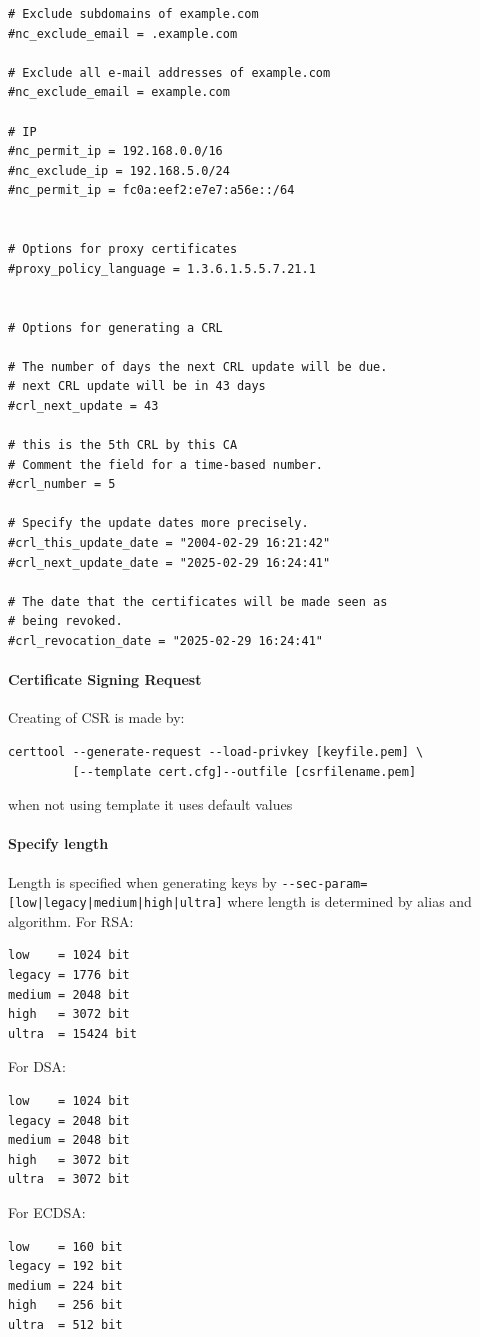 \documentclass[10pt, a4paper]{report}
\begin{document}
\begin{verbatim}
# Exclude subdomains of example.com
#nc_exclude_email = .example.com

# Exclude all e-mail addresses of example.com
#nc_exclude_email = example.com

# IP
#nc_permit_ip = 192.168.0.0/16
#nc_exclude_ip = 192.168.5.0/24
#nc_permit_ip = fc0a:eef2:e7e7:a56e::/64


# Options for proxy certificates
#proxy_policy_language = 1.3.6.1.5.5.7.21.1


# Options for generating a CRL

# The number of days the next CRL update will be due.
# next CRL update will be in 43 days
#crl_next_update = 43

# this is the 5th CRL by this CA
# Comment the field for a time-based number.
#crl_number = 5

# Specify the update dates more precisely.
#crl_this_update_date = "2004-02-29 16:21:42"
#crl_next_update_date = "2025-02-29 16:24:41"

# The date that the certificates will be made seen as
# being revoked.
#crl_revocation_date = "2025-02-29 16:24:41"
\end{verbatim}

      \paragraph{Certificate Signing Request}
Creating of CSR is made by:
\begin{verbatim}
certtool --generate-request --load-privkey [keyfile.pem] \
         [--template cert.cfg]--outfile [csrfilename.pem]
\end{verbatim}

when not using template it uses default values 
      \paragraph{Specify length}
Length is specified when generating keys by \verb+--sec-param=[low|legacy|medium|high|ultra]+ where length is determined by alias and algorithm.
For RSA:
\begin{verbatim}
low    = 1024 bit
legacy = 1776 bit
medium = 2048 bit
high   = 3072 bit
ultra  = 15424 bit
\end{verbatim}
For DSA:
\begin{verbatim}
low    = 1024 bit
legacy = 2048 bit
medium = 2048 bit
high   = 3072 bit
ultra  = 3072 bit
\end{verbatim}
For ECDSA:
\begin{verbatim}
low    = 160 bit
legacy = 192 bit
medium = 224 bit
high   = 256 bit
ultra  = 512 bit
\end{verbatim}
\end{document}
